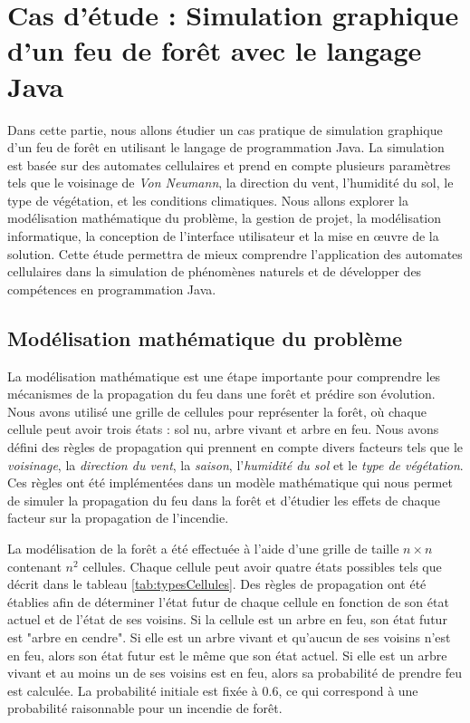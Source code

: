 \section{Cas d’étude : Simulation graphique d’un feu de forêt avec le langage Java}

Dans cette partie, nous allons étudier un cas pratique de simulation graphique d'un feu de forêt en utilisant le langage de programmation Java. La simulation est basée sur des automates cellulaires et prend en compte plusieurs paramètres tels que le voisinage de \textit{Von Neumann}, la direction du vent, l'humidité du sol, le type de végétation, et les conditions climatiques. Nous allons explorer la modélisation mathématique du problème, la gestion de projet, la modélisation informatique, la conception de l'interface utilisateur et la mise en œuvre de la solution. Cette étude permettra de mieux comprendre l'application des automates cellulaires dans la simulation de phénomènes naturels et de développer des compétences en programmation Java.

\subsection{Modélisation mathématique du problème}
\label{sec:modélisationMath}

La modélisation mathématique est une étape importante pour comprendre les mécanismes de la propagation du feu dans une forêt et prédire son évolution. Nous avons utilisé une grille de cellules pour représenter la forêt, où chaque cellule peut avoir trois états : sol nu, arbre vivant et arbre en feu. Nous avons défini des règles de propagation qui prennent en compte divers facteurs tels que le {\it voisinage}, la {\it direction du vent}, la {\it saison}, l'{\it humidité du sol} et le {\it type de végétation}. Ces règles ont été implémentées dans un modèle mathématique qui nous permet de simuler la propagation du feu dans la forêt et d'étudier les effets de chaque facteur sur la propagation de l'incendie.

La modélisation de la forêt a été effectuée à l'aide d'une grille de taille $n \times n$ contenant $n^2$ cellules. Chaque cellule peut avoir quatre états possibles tels que décrit dans le tableau \ref{tab:typesCellules}. Des règles de propagation ont été établies afin de déterminer l'état futur de chaque cellule en fonction de son état actuel et de l'état de ses voisins. Si la cellule est un arbre en feu, son état futur est "arbre en cendre". Si elle est un arbre vivant et qu'aucun de ses voisins n'est en feu, alors son état futur est le même que son état actuel. Si elle est un arbre vivant et au moins un de ses voisins est en feu, alors sa probabilité de prendre feu est calculée. La probabilité initiale est fixée à $0.6$, ce qui correspond à une probabilité raisonnable pour un incendie de forêt.

